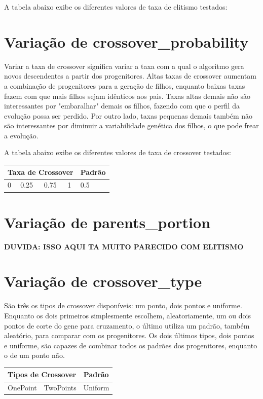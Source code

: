 \documentclass[12pt]{article}
\begin{document}
A tabela abaixo exibe os diferentes valores de taxa de elitismo testados:

\section{Variação de crossover\_probability}

Variar a taxa de crossover significa variar a taxa com a qual o algoritmo gera novos descendentes a partir dos progenitores. Altas taxas de crossover aumentam a combinação de progenitores para a geração de filhos, enquanto baixas taxas fazem com que mais filhos sejam idênticos aos pais. Taxas altas demais não são interessantes por "embaralhar" demais os filhos, fazendo com que o perfil da evolução possa ser perdido. Por outro lado, taxas pequenas demais também não são interessantes por diminuir a variabilidade genética dos filhos, o que pode frear a evolução.

A tabela abaixo exibe os diferentes valores de taxa de crossover testados:

\begin{table}[H]
	\centering
	\begin{tabular}{|l|l|l|l|l|}
		\hline
		\multicolumn{4}{|l|}{Taxa de Crossover} & Padrão \\ \hline
		0    & 0.25    & 0.75    & 1   &0.5 \\ \hline
	\end{tabular}
\end{table}

\section{Variação de parents\_portion}

\textbf{DUVIDA: ISSO AQUI TA MUITO PARECIDO COM ELITISMO}

\section{Variação de crossover\_type}

São três os tipos de crossover disponíveis: um ponto, dois pontos e uniforme. Enquanto os dois primeiros simplesmente escolhem, aleatoriamente, um ou dois pontos de corte do gene para cruzamento, o último utiliza um padrão, também aleatório, para comparar com os progenitores. Os dois últimos tipos, dois pontos e uniforme, são capazes de combinar todos os padrões dos progenitores, enquanto o de um ponto não.

\begin{table}[H]
	\centering
	\begin{tabular}{|l|l|l|}
		\hline
		\multicolumn{2}{|l|}{Tipos de Crossover}&Padrão \\ \hline
		OnePoint    & TwoPoints    & Uniform    \\ \hline
	\end{tabular}
\end{table}
	
	 
	
\end{document}

